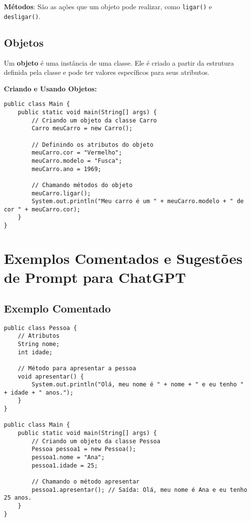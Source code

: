 \documentclass[a4paper,12pt]{book}
\begin{document}
\textbf{Métodos}: São as ações que um objeto pode realizar, como \texttt{ligar()} e \texttt{desligar()}.

\subsection{Objetos}

Um \textbf{objeto} é uma instância de uma classe. Ele é criado a partir da estrutura definida pela classe e pode ter valores específicos para seus atributos.

\textbf{Criando e Usando Objetos:}

\begin{verbatim}
public class Main {
    public static void main(String[] args) {
        // Criando um objeto da classe Carro
        Carro meuCarro = new Carro();
        
        // Definindo os atributos do objeto
        meuCarro.cor = "Vermelho";
        meuCarro.modelo = "Fusca";
        meuCarro.ano = 1969;
        
        // Chamando métodos do objeto
        meuCarro.ligar();
        System.out.println("Meu carro é um " + meuCarro.modelo + " de cor " + meuCarro.cor);
    }
}
\end{verbatim}

\section{Exemplos Comentados e Sugestões de Prompt para ChatGPT}

\subsection{Exemplo Comentado}

\begin{verbatim}
public class Pessoa {
    // Atributos
    String nome;
    int idade;

    // Método para apresentar a pessoa
    void apresentar() {
        System.out.println("Olá, meu nome é " + nome + " e eu tenho " + idade + " anos.");
    }
}

public class Main {
    public static void main(String[] args) {
        // Criando um objeto da classe Pessoa
        Pessoa pessoa1 = new Pessoa();
        pessoa1.nome = "Ana";
        pessoa1.idade = 25;

        // Chamando o método apresentar
        pessoa1.apresentar(); // Saída: Olá, meu nome é Ana e eu tenho 25 anos.
    }
}
\end{verbatim}
\end{document}
